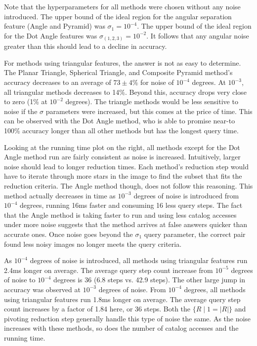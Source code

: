 Note that the hyperparameters for all methods were chosen without any noise introduced.
The upper bound of the ideal region for the angular separation feature (Angle and Pyramid) was $\sigma_1 = 10^{-4}$.
The upper bound of the ideal region for the Dot Angle features was $\sigma_{(1, 2, 3)} = 10^{-2}$.
It follows that any angular noise greater than this should lead to a decline in accuracy.

For methods using triangular features, the answer is not as easy to determine.
The Planar Triangle, Spherical Triangle, and Composite Pyramid method's accuracy decreases to an average of
$73 \pm 4\%$ for noise of $10^{-4}$ degrees.
At $10^{-3}$, all triangular methods decreases to 14\%.
Beyond this, accuracy drops very close to zero (1\% at $10^{-2}$ degrees).
The triangle methods would be less sensitive to noise if the $\sigma$ parameters were increased, but this comes at the
price of time.
This can be observed with the Dot Angle method, who is able to promise near-to 100\% accuracy longer than all other
methods but has the longest query time.

Looking at the running time plot on the right, all methods except for the Dot Angle method run are fairly consistent
as noise is increased.
Intuitively, larger noise should lead to longer reduction times.
Each method's reduction step would have to iterate through more stars in the image to find the subset that fits the
reduction criteria.
The Angle method though, does not follow this reasoning.
This method actually decreases in time as $10^{-3}$ degrees of noise is introduced from $10^{-4}$ degrees, running 16ms
faster and consuming 16 less query steps.
The fact that the Angle method is taking faster to run and using less catalog accesses under more noise suggests that
the method arrives at false answers quicker than accurate ones.
Once noise goes beyond the $\sigma_1$ query parameter, the correct pair found less noisy images no longer meets the
query criteria.

As $10^{-4}$ degrees of noise is introduced, all methods using triangular features run 2.4ms longer on average.
The average query step count increase from $10^{-5}$ degrees of noise to $10^{-4}$ degrees is 36 (6.8 steps vs.
42.9 steps).
The other large jump in accuracy was observed at $10^{-3}$ degrees of noise.
From $10^{-4}$ degrees, all methods using triangular features run 1.8ms longer on average.
The average query step count increases by a factor of 1.84 here, or 36 steps.
Both the $\{ R \mid 1 = |R| \}$ and pivoting reduction step generally handle this type of noise the same.
As the noise increases with these methods, so does the number of catalog accesses and the running time.

